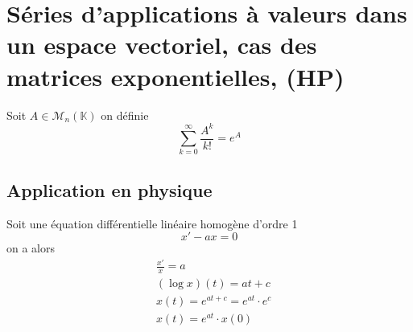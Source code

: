 \documentclass[11pt,colorlinks]{book}
\theoremstyle{mytheoremstyle}
\theoremstyle{mytheoremstyle}
\theoremstyle{mytheoremstyle}
\theoremstyle{mytheoremstyle}
\theoremstyle{mytheoremstyle}
\theoremstyle{mytheoremstyle}
\theoremstyle{mytheoremstyle}
\theoremstyle{mytheoremstyle}
\theoremstyle{myproblemstyle}
\def\mbb#1{\mathbb{#1}}
\def\mfc#1{\mathcal{#1}}
\def\bK{\mbb{K}}
\begin{document}
\section{Séries d'applications à valeurs dans un espace vectoriel, cas des matrices exponentielles, (HP)}
\begin{definition}
  Soit $A \in \mfc{M}_n(\bK)$ on définie
  \begin{equation*}
    \sum_{k=0}^{\infty} \frac{A^k}{k!} = e^A
  \end{equation*}
\end{definition}
\subsection{Application en physique}
\begin{definition}
  Soit une équation différentielle linéaire homogène d'ordre 1 
  \begin{equation*}
    x' - ax = 0
  \end{equation*}
  on a alors 
  \begin{align*}
    &\frac{x'}{x} = a \\ 
    &(\log x)(t) = at + c \\ 
    &x(t) = e^{at+c} = e^{at} \cdot e^c \\ 
    &x(t) = e^{at} \cdot x(0)
  \end{align*}
\end{definition}
\end{document}
